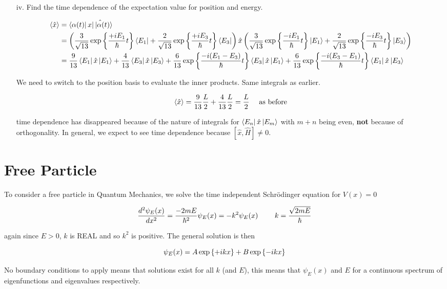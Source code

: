 \documentclass[english, 11pt]{article}
\begin{document}
\begin{exmp}
\begin{itemize}
          \item[iv.] Find the time dependence of the expectation value for position and energy.\newline

          \begin{align*}
            \langle \hat{x} \rangle & = \left\langle\alpha(t)\right|\hat{x|\left|\alpha(t)\right\rangle} \\
            & = \left( \frac{3}{\sqrt{13}} \exp \left\{ \frac{+iE_1}{\hbar}t \right\}\left\langle E_1\right| + \frac{2}{\sqrt{13}} \exp \left\{ \frac{+iE_3}{\hbar}t \right\}\left\langle E_3\right| \right) \hat{x} \left( \frac{3}{\sqrt{13}} \exp \left\{ \frac{-iE_1}{\hbar}t \right\}\left|E_1\right\rangle + \frac{2}{\sqrt{13}} \exp \left\{ \frac{-iE_3}{\hbar}t \right\}\left|E_3\right\rangle \right) \\
            & = \frac{9}{13} \left\langle E_1\right|\hat{x}\left|E_1\right\rangle + \frac{4}{13} \left\langle E_3\right|\hat{x}\left|E_3\right\rangle + \frac{6}{13} \exp \left\{ \frac{-i(E_1-E_3)}{\hbar}t \right\} \left\langle E_3\right|\hat{x}\left|E_1\right\rangle + \frac{6}{13} \exp \left\{ \frac{-i(E_3-E_1)}{\hbar}t \right\} \left\langle E_1\right|\hat{x}\left|E_3\right\rangle
          \end{align*}

          We need to switch to the position basis to evaluate the inner products. Same integrals as earlier.

          \[ \langle \hat{x} \rangle = \frac{9}{13} \frac{L}{2} + \frac{4}{13} \frac{L}{2} = \frac{L}{2} \ \ \ \ \mbox{as before} \]

          time dependence has disappeared because of the nature of integrals for $\left\langle E_n\right|\hat{x}\left|E_m\right\rangle$ with $m+n$ being even, \textbf{not} because of orthogonality. In general, we expect to see time dependence because $[\hat{x}, \hat{H}] \not = 0$.

        \end{itemize}
      \end{exmp}


  \section{Free Particle}

    To consider a free particle in Quantum Mechanics, we solve the time independent Schrödinger equation for $V(x) = 0$

    \[ \frac{d^2\psi_E(x)}{dx^2} = \frac{-2mE}{\hbar^2}\psi_E(x) = -k^2 \psi_E(x) \ \ \ \ \ \ \ k = \frac{\sqrt{2mE}}{\hbar} \]

    again since $E > 0$, $k$ is REAL and so $k^2$ is positive. The general solution is then

    \[ \psi_E(x) = A\exp \left\{ +ikx \right\} + B\exp \left\{ -ikx \right\} \]

    No boundary conditions to apply means that solutions exist for all $k$ (and $E$), this means that $\psi_E(x)$ and $E$ for a continuous spectrum of eigenfunctions and eigenvalues respectively. \newline
\end{document}
